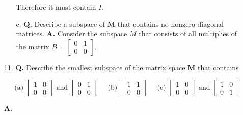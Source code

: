 \documentclass[main.tex]{subfiles}
\begin{document}
\begin{enumerate}
\begin{enumerate}
        Therefore it must contain $I$.
        
        \item [c.] \textbf{Q.} Describe a subspace of $\mathbf{M}$ that contains no nonzero diagonal matrices. \textbf{A.} Consider the subspace $M$ that consists of all multiplies of the matrix $B=\left[\begin{array}{ll}0 & 1 \\0 & 0\end{array}\right]$. 
        
    \end{enumerate}
    
    \item [11.] \textbf{Q.} Describe the smallest subspace of the matrix space $\mathbf{M}$ that contains
    
    $$
    \text{ (a) } \left[\begin{array}{ll}1 & 0 \\ 0 & 0\end{array}\right] \text{ and } \left[\begin{array}{ll}0 & 1 \\ 0 & 0\end{array}\right] \quad
    \text{ (b) } \left[\begin{array}{ll}1 & 1 \\ 0 & 0\end{array}\right] \quad
    \text{ (c) } \left[\begin{array}{ll}1 & 0 \\ 0 & 0\end{array}\right] \text{ and } \left[\begin{array}{ll}1 & 0 \\ 0 & 1\end{array}\right]
    $$
    
    \textbf{A.}
    

\end{enumerate}
\end{document}
